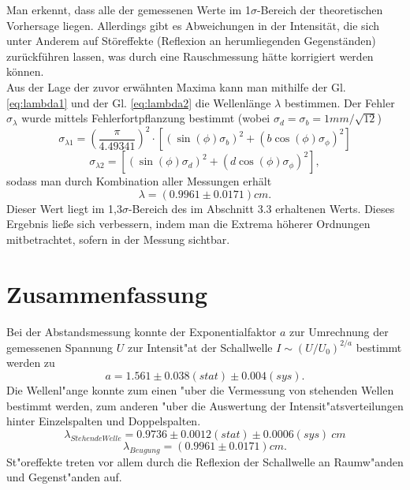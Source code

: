 \documentclass[12pt,a4paper]{article}
\begin{document}
Man erkennt, dass alle der gemessenen Werte im 1$\sigma$-Bereich der theoretischen Vorhersage liegen. Allerdings gibt es Abweichungen in der Intensität, die sich unter Anderem auf Störeffekte (Reflexion an herumliegenden Gegenständen) zurückführen lassen, was durch eine Rauschmessung hätte korrigiert werden können.\\
Aus der Lage der zuvor erwähnten Maxima kann man mithilfe der Gl. \ref{eq:lambda1} und der Gl. \ref{eq:lambda2} die Wellenlänge $\lambda$ bestimmen. Der Fehler $\sigma_\lambda$ wurde mittels Fehlerfortpflanzung bestimmt (wobei $\sigma_d=\sigma_b=1mm/\sqrt{12}$)
\begin{equation*}
	\sigma_{\lambda 1} = \left(\frac{\pi}{4.49341}\right)^2 \cdot \left[(\sin(\phi)\sigma_b)^2+(b\cos(\phi)\sigma_\phi)^2\right]
\end{equation*}
\begin{equation*}
	\sigma_{\lambda 2} = \left[(\sin(\phi)\sigma_d)^2+(d\cos(\phi)\sigma_\phi)^2\right],
\end{equation*}
sodass man durch Kombination aller Messungen erhält
\begin{equation}
	\lambda = (0.9961 \pm 0.0171) cm.
\end{equation}
Dieser Wert liegt im 1,3$\sigma$-Bereich des im Abschnitt 3.3 erhaltenen Werts. Dieses Ergebnis lie\ss e sich verbessern, indem man die Extrema höherer Ordnungen mitbetrachtet, sofern in der Messung sichtbar.


\section{Zusammenfassung}
Bei der Abstandsmessung konnte der Exponentialfaktor $a$ zur Umrechnung der gemessenen Spannung $U$ zur Intensit"at der Schallwelle $I\sim(U/U_0)^{2/a}$ bestimmt werden zu
\begin{equation}
a=1.561\pm0.038(stat)\pm0.004(sys).
\end{equation}
Die Wellenl"ange konnte zum einen "uber die Vermessung von stehenden Wellen bestimmt werden, zum anderen "uber die Auswertung der Intensit"atsverteilungen hinter Einzelspalten und Doppelspalten.
\begin{equation}
\lambda_{Stehende Welle}=0.9736\pm0.0012(stat)\pm0.0006(sys)\ cm
\end{equation}
\begin{equation}
\lambda_{Beugung} = (0.9961 \pm 0.0171) cm.
\end{equation}
St"oreffekte treten vor allem durch die Reflexion der Schallwelle an Raumw"anden und Gegenst"anden auf.
\end{document}
